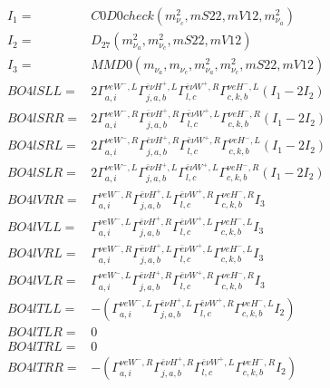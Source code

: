 \documentclass[A4,landscape]{article}
\begin{document}
\begin{align} 
I_1 = & C0D0check(m^2_{\nu_{{c}}}, mS22, mV12, m^2_{\nu_{{a}}}) \\ 
I_2 = & D_{27}(m^2_{\nu_{{a}}}, m^2_{\nu_{{c}}}, mS22, mV12) \\ 
I_3 = & MMD0(m_{\nu_{{a}}}, m_{\nu_{{c}}}, m^2_{\nu_{{a}}}, m^2_{\nu_{{c}}}, mS22, mV12) \\ 
  BO4lSLL= & 2  \Gamma^{\nu e W^-,L}_{a, i} \Gamma^{\bar{e}\nu H^+,L}_{j, a, b} \Gamma^{\bar{e}\nu W^+ ,R}_{l, c} \Gamma^{\nu e H^- ,L}_{c, k, b} (I_1 - 2 I_2) \\ 
  BO4lSRR= & 2  \Gamma^{\nu e W^-,R}_{a, i} \Gamma^{\bar{e}\nu H^+,R}_{j, a, b} \Gamma^{\bar{e}\nu W^+ ,L}_{l, c} \Gamma^{\nu e H^- ,R}_{c, k, b} (I_1 - 2 I_2) \\ 
  BO4lSRL= & 2  \Gamma^{\nu e W^-,R}_{a, i} \Gamma^{\bar{e}\nu H^+,R}_{j, a, b} \Gamma^{\bar{e}\nu W^+ ,R}_{l, c} \Gamma^{\nu e H^- ,L}_{c, k, b} (I_1 - 2 I_2) \\ 
  BO4lSLR= & 2  \Gamma^{\nu e W^-,L}_{a, i} \Gamma^{\bar{e}\nu H^+,L}_{j, a, b} \Gamma^{\bar{e}\nu W^+ ,L}_{l, c} \Gamma^{\nu e H^- ,R}_{c, k, b} (I_1 - 2 I_2) \\ 
  BO4lVRR= &  \Gamma^{\nu e W^-,R}_{a, i} \Gamma^{\bar{e}\nu H^+,L}_{j, a, b} \Gamma^{\bar{e}\nu W^+ ,R}_{l, c} \Gamma^{\nu e H^- ,R}_{c, k, b} I_3 \\ 
  BO4lVLL= &  \Gamma^{\nu e W^-,L}_{a, i} \Gamma^{\bar{e}\nu H^+,R}_{j, a, b} \Gamma^{\bar{e}\nu W^+ ,L}_{l, c} \Gamma^{\nu e H^- ,L}_{c, k, b} I_3 \\ 
  BO4lVRL= &  \Gamma^{\nu e W^-,R}_{a, i} \Gamma^{\bar{e}\nu H^+,L}_{j, a, b} \Gamma^{\bar{e}\nu W^+ ,L}_{l, c} \Gamma^{\nu e H^- ,L}_{c, k, b} I_3 \\ 
  BO4lVLR= &  \Gamma^{\nu e W^-,L}_{a, i} \Gamma^{\bar{e}\nu H^+,R}_{j, a, b} \Gamma^{\bar{e}\nu W^+ ,R}_{l, c} \Gamma^{\nu e H^- ,R}_{c, k, b} I_3 \\ 
  BO4lTLL= & -( \Gamma^{\nu e W^-,L}_{a, i} \Gamma^{\bar{e}\nu H^+,L}_{j, a, b} \Gamma^{\bar{e}\nu W^+ ,R}_{l, c} \Gamma^{\nu e H^- ,L}_{c, k, b} I_2) \\ 
  BO4lTLR= & 0 \\ 
  BO4lTRL= & 0 \\ 
  BO4lTRR= & -( \Gamma^{\nu e W^-,R}_{a, i} \Gamma^{\bar{e}\nu H^+,R}_{j, a, b} \Gamma^{\bar{e}\nu W^+ ,L}_{l, c} \Gamma^{\nu e H^- ,R}_{c, k, b} I_2) \\ 
\end{align} 
\end{document}
